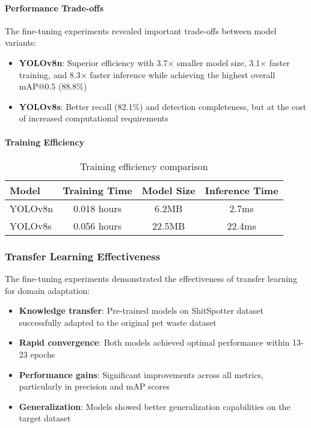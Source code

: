\documentclass[12pt,a4paper]{article}
\begin{document}
\paragraph{Performance Trade-offs}
The fine-tuning experiments revealed important trade-offs between model variants:
\begin{itemize}
    \item \textbf{YOLOv8n}: Superior efficiency with 3.7× smaller model size, 3.1× faster training, and 8.3× faster inference while achieving the highest overall mAP@0.5 (88.8\%)
    \item \textbf{YOLOv8s}: Better recall (82.1\%) and detection completeness, but at the cost of increased computational requirements
\end{itemize}

\paragraph{Training Efficiency}
\begin{table}[H]
\centering
\begin{tabular}{lccc}
\toprule
\textbf{Model} & \textbf{Training Time} & \textbf{Model Size} & \textbf{Inference Time} \\
\midrule
YOLOv8n & 0.018 hours & 6.2MB & 2.7ms \\
YOLOv8s & 0.056 hours & 22.5MB & 22.4ms \\
\bottomrule
\end{tabular}
\caption{Training efficiency comparison}
\label{tab:training_efficiency}
\end{table}

\subsubsection{Transfer Learning Effectiveness}
The fine-tuning experiments demonstrated the effectiveness of transfer learning for domain adaptation:
\begin{itemize}
    \item \textbf{Knowledge transfer}: Pre-trained models on ShitSpotter dataset successfully adapted to the original pet waste dataset
    \item \textbf{Rapid convergence}: Both models achieved optimal performance within 13-23 epochs
    \item \textbf{Performance gains}: Significant improvements across all metrics, particularly in precision and mAP scores
    \item \textbf{Generalization}: Models showed better generalization capabilities on the target dataset
\end{itemize}
\end{document}
